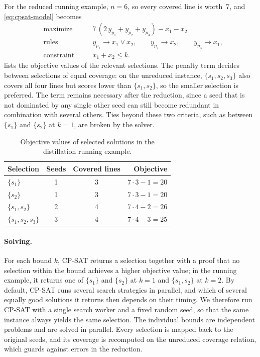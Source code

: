 For the reduced running example, $n=6$, so every covered line is worth~$7$, and \eqref{eq:cpsat-model} becomes
\begin{equation*}
  \begin{alignedat}{2}
    &\text{maximize}   &\quad& 7\,(2\,y_{p_1} + y_{p_2} + y_{p_3}) - x_1 - x_2 \\
    &\text{rules}      &     & y_{p_1} \rightarrow x_1 \lor x_2, \qquad
                               y_{p_2} \rightarrow x_2, \qquad
                               y_{p_3} \rightarrow x_1, \\
    &\text{constraint} &     & x_1 + x_2 \leq k.
  \end{alignedat}
\end{equation*}
 lists the objective values of the relevant selections.
The penalty term decides between selections of equal coverage: on the unreduced instance, $\{s_1, s_2, s_3\}$ also covers all four lines but scores lower than $\{s_1, s_2\}$, so the smaller selection is preferred.
The term remains necessary after the reduction, since a seed that is not dominated by any single other seed can still become redundant in combination with several others.
Ties beyond these two criteria, such as between $\{s_1\}$ and $\{s_2\}$ at $k=1$, are broken by the solver.

\begin{table}
  \centering

  \begin{tabular}{@{}lccr@{}}
    \toprule
    Selection & Seeds & Covered lines & Objective \\
    \midrule
    $\{s_1\}$           & 1 & 3 & $7\cdot 3 - 1 = 20$ \\
    $\{s_2\}$           & 1 & 3 & $7\cdot 3 - 1 = 20$ \\
    $\{s_1, s_2\}$      & 2 & 4 & $7\cdot 4 - 2 = 26$ \\
    $\{s_1, s_2, s_3\}$ & 3 & 4 & $7\cdot 4 - 3 = 25$ \\
    \bottomrule
  \end{tabular}
  \caption{Objective values of selected solutions in the distillation running example.}
  \label{tab:distillation-example-scores}
\end{table}

\paragraph{Solving.}
For each bound $k$, CP-SAT returns a selection together with a proof that no selection within the bound achieves a higher objective value; in the running example, it returns one of $\{s_1\}$ and $\{s_2\}$ at $k=1$ and $\{s_1, s_2\}$ at $k=2$.
By default, CP-SAT runs several search strategies in parallel, and which of several equally good solutions it returns then depends on their timing.
We therefore run CP-SAT with a single search worker and a fixed random seed, so that the same instance always yields the same selection.
The individual bounds are independent problems and are solved in parallel.
Every selection is mapped back to the original seeds, and its coverage is recomputed on the unreduced coverage relation, which guards against errors in the reduction.

